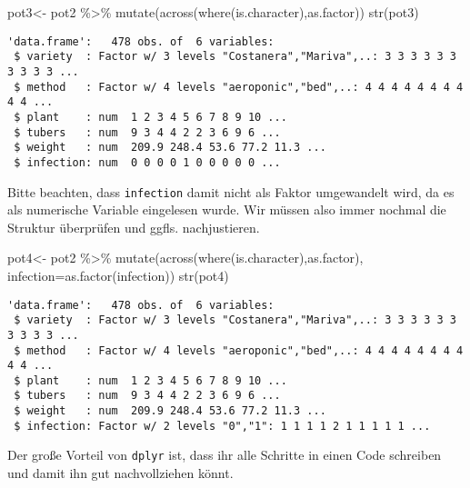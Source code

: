 \documentclass[
  letterpaper,
  DIV=11,
  numbers=noendperiod]{scrartcl}
\newenvironment{Shaded}{\begin{snugshade}}{\end{snugshade}}
\newcommand{\AttributeTok}[1]{\textcolor[rgb]{0.40,0.45,0.13}{#1}}
\newcommand{\FunctionTok}[1]{\textcolor[rgb]{0.28,0.35,0.67}{#1}}
\newcommand{\NormalTok}[1]{\textcolor[rgb]{0.00,0.23,0.31}{#1}}
\newcommand{\OtherTok}[1]{\textcolor[rgb]{0.00,0.23,0.31}{#1}}
\newcommand{\SpecialCharTok}[1]{\textcolor[rgb]{0.37,0.37,0.37}{#1}}
\begin{document}
\begin{Shaded}
\begin{Highlighting}[]
\NormalTok{pot3}\OtherTok{\textless{}{-}}\NormalTok{ pot2 }\SpecialCharTok{\%\textgreater{}\%} \FunctionTok{mutate}\NormalTok{(}\FunctionTok{across}\NormalTok{(}\FunctionTok{where}\NormalTok{(is.character),as.factor))}
\FunctionTok{str}\NormalTok{(pot3)}
\end{Highlighting}
\end{Shaded}

\begin{verbatim}
'data.frame':   478 obs. of  6 variables:
 $ variety  : Factor w/ 3 levels "Costanera","Mariva",..: 3 3 3 3 3 3 3 3 3 3 ...
 $ method   : Factor w/ 4 levels "aeroponic","bed",..: 4 4 4 4 4 4 4 4 4 4 ...
 $ plant    : num  1 2 3 4 5 6 7 8 9 10 ...
 $ tubers   : num  9 3 4 4 2 2 3 6 9 6 ...
 $ weight   : num  209.9 248.4 53.6 77.2 11.3 ...
 $ infection: num  0 0 0 0 1 0 0 0 0 0 ...
\end{verbatim}

Bitte beachten, dass \texttt{infection} damit nicht als Faktor
umgewandelt wird, da es als numerische Variable eingelesen wurde. Wir
müssen also immer nochmal die Struktur überprüfen und ggfls.
nachjustieren.

\begin{Shaded}
\begin{Highlighting}[]
\NormalTok{pot4}\OtherTok{\textless{}{-}}\NormalTok{ pot2 }\SpecialCharTok{\%\textgreater{}\%} \FunctionTok{mutate}\NormalTok{(}\FunctionTok{across}\NormalTok{(}\FunctionTok{where}\NormalTok{(is.character),as.factor),}
                       \AttributeTok{infection=}\FunctionTok{as.factor}\NormalTok{(infection))}
\FunctionTok{str}\NormalTok{(pot4)}
\end{Highlighting}
\end{Shaded}

\begin{verbatim}
'data.frame':   478 obs. of  6 variables:
 $ variety  : Factor w/ 3 levels "Costanera","Mariva",..: 3 3 3 3 3 3 3 3 3 3 ...
 $ method   : Factor w/ 4 levels "aeroponic","bed",..: 4 4 4 4 4 4 4 4 4 4 ...
 $ plant    : num  1 2 3 4 5 6 7 8 9 10 ...
 $ tubers   : num  9 3 4 4 2 2 3 6 9 6 ...
 $ weight   : num  209.9 248.4 53.6 77.2 11.3 ...
 $ infection: Factor w/ 2 levels "0","1": 1 1 1 1 2 1 1 1 1 1 ...
\end{verbatim}

Der große Vorteil von \texttt{dplyr} ist, dass ihr alle Schritte in
einen Code schreiben und damit ihn gut nachvollziehen könnt.
\end{document}
